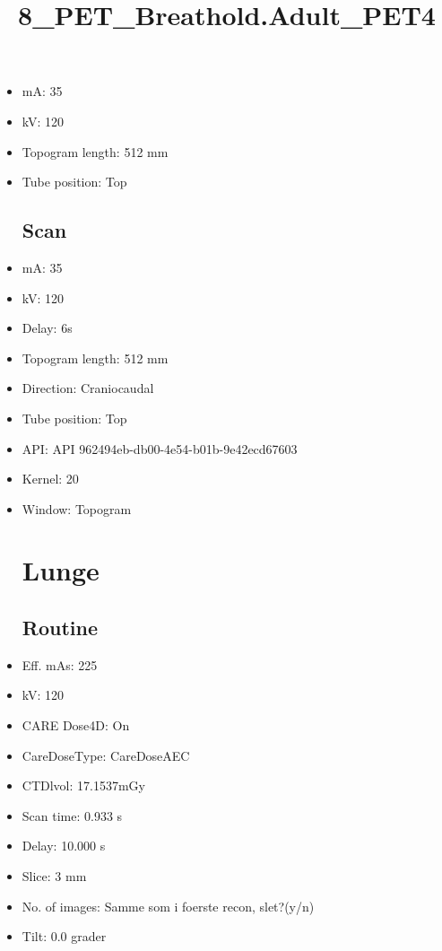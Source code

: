 \documentclass[12pt]{article}
\title{8\_PET\_Breathold.Adult\_PET4}
\begin{document}
\maketitle
\newpage
\tableofcontents
\newpage
{}


\begin{itemize}[noitemsep]\section{Topogram}
\subsection{Routine}
\item mA: 35\item kV: 120\item Topogram length: 512 mm\item Tube position: Top
\subsection{Scan}\item mA: 35\item kV: 120\item Delay: 6s\item Topogram length: 512 mm\item Direction: Craniocaudal\item Tube position: Top\item API: API 962494eb-db00-4e54-b01b-9e42ecd67603\item Kernel: 20\item Window: Topogram
\section{Lunge}
\subsection{Routine}
\item Eff. mAs: 225\item kV: 120\item CARE Dose4D: On\item CareDoseType: CareDoseAEC\item CTDlvol: 17.1537mGy\item Scan time: 0.933 s\item Delay: 10.000 s\item Slice: 3 mm\item No. of images: Samme som i foerste recon, slet?(y/n)\item Tilt: 0.0 grader

\end{itemize}
\end{document}
